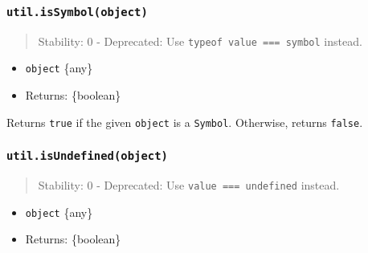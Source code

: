 \subsubsection{\texorpdfstring{\texttt{util.isSymbol(object)}}{util.isSymbol(object)}}\label{util.issymbolobject}

\begin{quote}
Stability: 0 - Deprecated: Use
\texttt{typeof\ value\ ===\ \textquotesingle{}symbol\textquotesingle{}}
instead.
\end{quote}

\begin{itemize}
\tightlist
\item
  \texttt{object} \{any\}
\item
  Returns: \{boolean\}
\end{itemize}

Returns \texttt{true} if the given \texttt{object} is a \texttt{Symbol}.
Otherwise, returns \texttt{false}.

\begin{Shaded}
\begin{Highlighting}[]
\OperatorTok{=} \NormalTok{(}\NormalTok{)}\OperatorTok{;}

\NormalTok{(}\NormalTok{)}\OperatorTok{;}
\NormalTok{(}\NormalTok{)}\OperatorTok{;}
\NormalTok{(}\NormalTok{(}\NormalTok{))}\OperatorTok{;}
\end{Highlighting}
\end{Shaded}

\subsubsection{\texorpdfstring{\texttt{util.isUndefined(object)}}{util.isUndefined(object)}}\label{util.isundefinedobject}

\begin{quote}
Stability: 0 - Deprecated: Use \texttt{value\ ===\ undefined} instead.
\end{quote}

\begin{itemize}
\tightlist
\item
  \texttt{object} \{any\}
\item
  Returns: \{boolean\}
\end{itemize}

